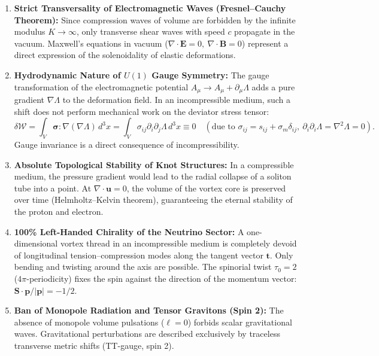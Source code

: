 \documentclass[12pt,a4paper]{article}
\begin{document}
	\begin{enumerate}
	\item \textbf{Strict Transversality of Electromagnetic Waves (Fresnel--Cauchy Theorem):}
	Since compression waves of volume are forbidden by the infinite modulus $K \to \infty$, only transverse shear waves with speed $c$ propagate in the vacuum. Maxwell's equations in vacuum ($\nabla \cdot \mathbf{E} = 0, \ \nabla \cdot \mathbf{B} = 0$) represent a direct expression of the solenoidality of elastic deformations.
		
	\item \textbf{Hydrodynamic Nature of $U(1)$ Gauge Symmetry:}
	The gauge transformation of the electromagnetic potential $A_\mu \to A_\mu + \partial_\mu \Lambda$ adds a pure gradient $\nabla \Lambda$ to the deformation field. In an incompressible medium, such a shift does not perform mechanical work on the deviator stress tensor:
	\begin{equation}
		\delta \mathcal{W} = \int_V \boldsymbol{\sigma} : \nabla(\nabla \Lambda) \, d^3x = \int_V \sigma_{ij} \partial_i \partial_j \Lambda \, d^3x \equiv 0 \quad (\text{due to } \sigma_{ij} = s_{ij} + \sigma_m \delta_{ij}, \ \partial_i \partial_i \Lambda = \nabla^2 \Lambda = 0).
	\end{equation}
	Gauge invariance is a direct consequence of incompressibility.
	
	\item \textbf{Absolute Topological Stability of Knot Structures:}
	In a compressible medium, the pressure gradient would lead to the radial collapse of a soliton tube into a point. At $\nabla \cdot \mathbf{u} = 0$, the volume of the vortex core is preserved over time (Helmholtz--Kelvin theorem), guaranteeing the eternal stability of the proton and electron.
		
	\item \textbf{100\% Left-Handed Chirality of the Neutrino Sector:}
	A one-dimensional vortex thread in an incompressible medium is completely devoid of longitudinal tension--compression modes along the tangent vector $\mathbf{t}$. Only bending and twisting around the axis are possible. The spinorial twist $\tau_0 = 2$ ($4\pi$-periodicity) fixes the spin against the direction of the momentum vector: $\mathbf{S} \cdot \mathbf{p} / |\mathbf{p}| = -1/2$.
		
	\item \textbf{Ban of Monopole Radiation and Tensor Gravitons (Spin 2):}
	The absence of monopole volume pulsations ($\ell = 0$) forbids scalar gravitational waves. Gravitational perturbations are described exclusively by traceless transverse metric shifts (TT-gauge, spin 2).
	\end{enumerate}
	
\end{document}
